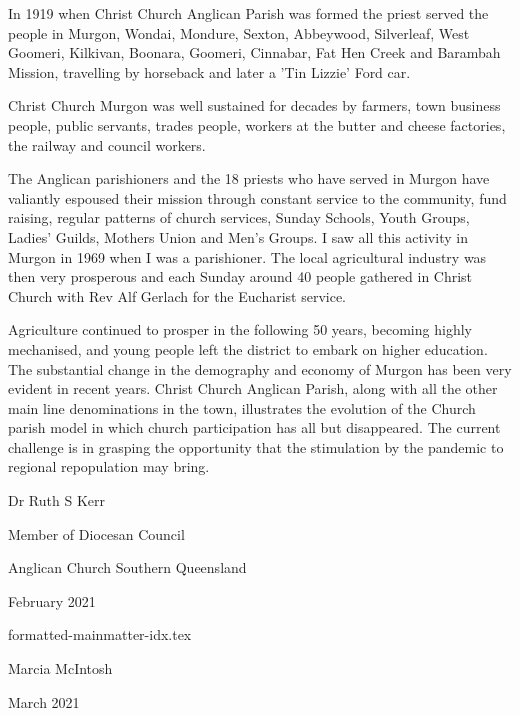\documentclass[a4paper,11pt,parskip=never,DIV=8,chapterprefix=true,titlepage=true,twoside,twocolumn,open=any]{scrbook}
\begin{document}
In 1919 when Christ Church Anglican Parish was formed the priest served the people in 
Murgon, Wondai, Mondure, Sexton, Abbeywood, Silverleaf, West Goomeri, Kilkivan, Boonara, 
Goomeri, Cinnabar, Fat Hen Creek and Barambah Mission, travelling by horseback and later 
a 'Tin Lizzie' Ford car. 

Christ Church Murgon was well sustained for decades by farmers, town business people, 
public servants, trades people, workers at the butter and cheese factories, the railway 
and council workers. 
\balance

The Anglican parishioners and the 18 priests who have served in Murgon have valiantly 
espoused their mission through constant service to the community, fund raising, regular 
patterns of church services, Sunday Schools, Youth Groups, Ladies' Guilds, Mothers Union 
and Men's Groups. I saw all this activity in Murgon in 1969 when I was a parishioner. The 
local agricultural industry was then very prosperous and each Sunday around 40 people gathered 
in Christ Church with Rev Alf Gerlach for the Eucharist service. 

Agriculture continued to prosper in the following 50 years, becoming highly mechanised, 
and young people left the district to embark on higher education. The substantial change 
in the demography and economy of Murgon has been very evident in recent years. Christ Church 
Anglican Parish, along with all the other main line denominations in the town, illustrates the 
evolution of the Church parish model in which church participation has all but disappeared. 
The current challenge is in grasping the opportunity that the stimulation by the pandemic 
to regional repopulation may bring.

\vspace{1cm}
\noindent Dr Ruth S Kerr
\vspace{5mm}

\noindent Member of Diocesan Council

\noindent Anglican Church Southern Queensland

 February 2021

{formatted-mainmatter-idx.tex}

\vspace{1.5cm}
\noindent Marcia McIntosh
\vspace{5mm}

\noindent March 2021

\printindex
\end{document}
